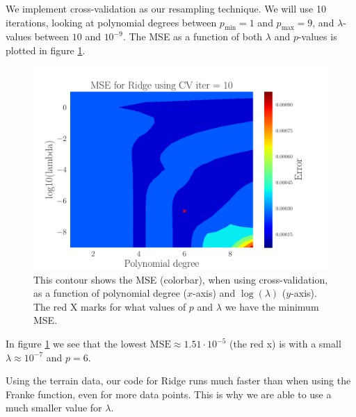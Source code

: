 \documentclass[reprint,english,notitlepage,aps,nobalancelastpage,nofootinbib]{revtex4-1}  %
\begin{document}
We implement cross-validation as our resampling technique. We will use 10 iterations, looking at polynomial degrees between $p_\text{min} = 1$ and $p_\text{max} = 9$, and $\lambda$-values between $10$ and $10^{-9}$. The MSE as a function of both $\lambda$ and $p$-values is plotted in figure \ref{fig:terrain_Ridge_MSE_CV}.
\begin{figure}[h]
	\includegraphics[width=0.8\linewidth]{SRTM_Contour_PL_Ridge_CV10_n50_eps0.2_p1_9_lmb1_m9.pdf}
	\caption{This contour shows the MSE (colorbar), when using cross-validation, as a function of polynomial degree ($x$-axis) and $\log(\lambda)$ ($y$-axis). The red X marks for what values of $p$ and $\lambda$ we have the minimum MSE.}
	\label{fig:terrain_Ridge_MSE_CV}
\end{figure}
In figure \ref{fig:terrain_Ridge_MSE_CV} we see that the lowest $\text{MSE} \approx 1.51\cdot10^{-5}$ (the red x) is with a small $\lambda \approx 10^{-7}$ and $p = 6$.

Using the terrain data, our code for Ridge runs much faster than when using the Franke function, even for more data points. This is why we are able to use a much smaller value for $\lambda$.
\end{document}
